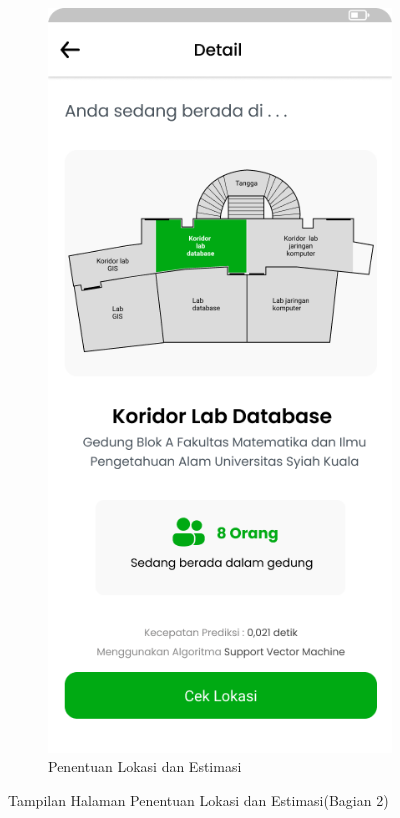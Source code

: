 \begin{enumerate}[a.]
\begin{figure} [H]
\begin{subfigure}{.5\textwidth}
			      \includegraphics[width=.5\linewidth]{gambar/applantai3.png}
			      \caption{Penentuan Lokasi dan Estimasi}
		      \end{subfigure}
		      \vspace{1cm}
		      \caption{Tampilan Halaman Penentuan Lokasi dan Estimasi(Bagian 2)}
		      \label{aplikasipenggunabagian2}
	      \end{figure}

\end{enumerate}

